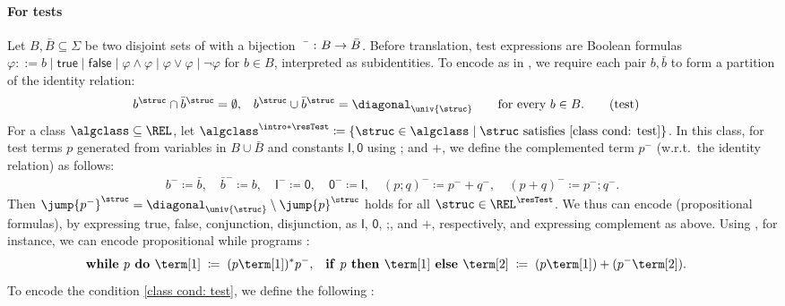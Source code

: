\documentclass[a4paper,UKenglish,cleveref, autoref, thm-restate]{lipics-v2021}
\DeclarePairedDelimiter\set{\{}{\}}
\newcommand{\const}[1]{\mathsf{#1}}
\newcommand{\defeq}{\coloneq}
\newcommand{\union}{\mathbin{+}}
\newcommand{\id}{\const{I}}
\newcommand{\emp}{\const{0}}
\newcommand{\compo}{\mathbin{;}}
\newcommand{\vsig}{\Sigma}
\begin{document}
\paragraph*{For tests}
Let $B, \bar{B} \subseteq \vsig$ be two disjoint sets of 
with a bijection $\bar{\mbox{\quad}} \colon B \to \bar{B}$.
Before translation, test expressions are Boolean formulas
$\varphi ::= b \mid \mathsf{true} \mid \mathsf{false} \mid
\varphi\land\varphi \mid \varphi\lor\varphi \mid \lnot\varphi$ for $b\in B$,
interpreted as subidentities.
To encode \intro*{} as in  \cite{kozenKleeneAlgebraTests1996},
we require each pair $b,\bar b$ to form a partition of the identity relation:
\begin{align*}
b^{\struc} \cap \bar b^{\struc} &= \emptyset,
& b^{\struc} \cup \bar b^{\struc} &= \diagonal_{\univ{\struc}}
\qquad\text{for every $b \in B$.} \tag{test}\label{class cond: test}
\end{align*}
\AP
For a class $\algclass \subseteq \REL$,
let $\algclass^{\intro*\resTest} \defeq \set{\struc \in \algclass \mid \text{$\struc$ satisfies \eqref{class cond: test}}}$.
In this class, for test terms $p$ generated from variables in $B \cup \bar{B}$ and constants $\id,\emp$ using $\compo$ and $\union$,
we define the complemented term $p^{-}$ (w.r.t.\  the identity relation) as follows:
\begin{gather*}
    b^{-} \defeq \bar{b}, \quad
    \bar{b}^{-} \defeq b, \quad
    \id^{-} \defeq \emp, \quad
    \emp^{-} \defeq \id, \quad
    (p \compo q)^{-} \defeq p^{-} \union q^{-}, \quad
    (p \union q)^{-} \defeq p^{-} \compo q^{-}.
\end{gather*}
Then $\jump{p^{-}}^{\struc} = \diagonal_{\univ{\struc}} \setminus \jump{p}^{\struc}$ holds for all $\struc \in \REL^{\resTest}$.
We thus can encode  (propositional formulas),
by expressing true, false, conjunction, disjunction,
as $\id$, $\emp$, $\compo$, and $\union$,
respectively,
and expressing complement as above.
Using , for instance, we can encode propositional while programs \cite{fischerPropositionalDynamicLogic1979,kozenKleeneAlgebraTests1997}:
\begin{align*}
    \mbox{\textbf{while }} p \mbox{\textbf{ do }} \term[1] &\;\defeq\; (p \term[1])^{*} p^{-}, &
    \mbox{\textbf{if }} p \mbox{\textbf{ then }} \term[1] \mbox{\textbf{ else }} \term[2] &\;\defeq\; (p \term[1]) \union (p^{-} \term[2]).
\end{align*}
To encode the condition \eqref{class cond: test}, we define the following :
\end{document}
